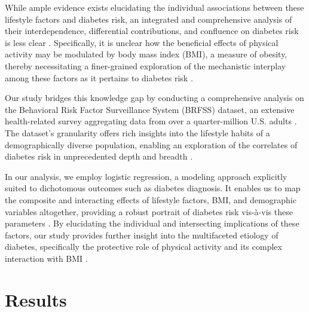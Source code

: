 \documentclass[11pt]{article}
\begin{document}
While ample evidence exists elucidating the individual associations between these lifestyle factors and diabetes risk, an integrated and comprehensive analysis of their interdependence, differential contributions, and confluence on diabetes risk is less clear \cite{Reis2011LifestyleFA, Oort2020AssociationOC, Zeng2020PhysicalAD}. Specifically, it is unclear how the beneficial effects of physical activity may be modulated by body mass index (BMI), a measure of obesity, thereby necessitating a finer-grained exploration of the mechanistic interplay among these factors as it pertains to diabetes risk \cite{Hjerkind2017AdiposityPA}.

Our study bridges this knowledge gap by conducting a comprehensive analysis on the Behavioral Risk Factor Surveillance System (BRFSS) dataset, an extensive health-related survey aggregating data from over a quarter-million U.S. adults \cite{Rolle-Lake2020BehavioralRF, Pierannunzi2013ASR}. The dataset's granularity offers rich insights into the lifestyle habits of a demographically diverse population, enabling an exploration of the correlates of diabetes risk in unprecedented depth and breadth \cite{Nelson2001ReliabilityAV, Iachan2016NationalWO}.

In our analysis, we employ logistic regression, a modeling approach explicitly suited to dichotomous outcomes such as diabetes diagnosis. It enables us to map the composite and interacting effects of lifestyle factors, BMI, and demographic variables altogether, providing a robust portrait of diabetes risk vis-à-vis these parameters \cite{Menard1996AppliedLR, Peduzzi1996ASS}. By elucidating the individual and intersecting implications of these factors, our study provides further insight into the multifaceted etiology of diabetes, specifically the protective role of physical activity and its complex interaction with BMI \cite{Harding2008PlasmaVC, Aune2015PhysicalAA}.

\section*{Results}
\end{document}
